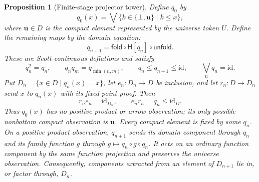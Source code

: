 \documentclass[11pt,a4paper]{article}
\newtheorem{proposition}[theorem]{Proposition}
\theoremstyle{definition}
\theoremstyle{remark}
\newcommand{\lub}{\bigvee}
\begin{document}
\begin{proposition}[Finite-stage projector tower]\label{prop:projector-tower}
Define $q_0$ by
\[
 q_0(x)=\lub\{k\in\{\bot,\mathbf u\}\mid k\leq x\},
\]
where $\mathbf u\in D$ is the compact element represented by the
universe token $U$. Define the remaining maps by the domain equation:
\[
 q_{n+1}=\mathsf{fold}\circ\mathsf H[q_n]\circ\mathsf{unfold}.
\]
These are Scott-continuous deflations and satisfy
\[
 q_n^2=q_n,\qquad q_nq_m=q_{\min(n,m)},\qquad
 q_n\leq q_{n+1}\leq\mathrm{id},\qquad
 \bigvee_n q_n=\mathrm{id}.
\]
Put $D_n=\{x\in D\mid q_n(x)=x\}$, let $e_n:D_n\to D$ be inclusion, and
let $r_n:D\to D_n$ send $x$ to $q_n(x)$ with its fixed-point proof. Then
\[
 r_ne_n=\mathrm{id}_{D_n},\qquad e_nr_n=q_n\leq\mathrm{id}_D.
\]
Thus $q_0(x)$ has no positive product or arrow observation; its only
possible nonbottom compact observation is $\mathbf u$. Every compact
element is fixed by some $q_n$. On a positive product observation,
$q_{n+1}$ sends its domain component through $q_n$ and its family
function $g$ through $g\mapsto q_n\circ g\circ q_n$. It acts on an
ordinary function component by the same function projection and
preserves the universe observation. Consequently, components extracted
from an element of $D_{n+1}$ lie in, or factor through, $D_n$.
\end{proposition}
\end{document}
